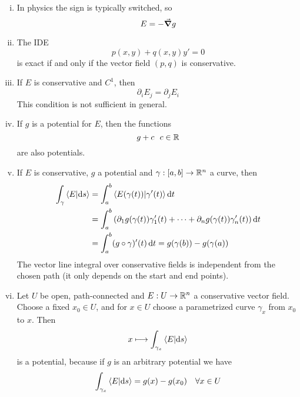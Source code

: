 \documentclass[../../script.tex]{subfiles}
\begin{document}
\begin{rem}
    \begin{enumerate}[(i)]
        \item In physics the sign is typically switched, so 
        \[
            E = -\grad{g}
        \]

        \item The IDE 
        \[
            p(x, y) + q(x, y)y' = 0
        \]
        is exact if and only if the vector field $(p, q)$ is conservative.

        \item If $E$ is conservative and $C^1$, then 
        \[
            \partial_i E_j = \partial_j E_i
        \]
        This condition is not sufficient in general.

        \item If $g$ is a potential for $E$, then the functions
        \[
            g + c ~~c \in \mathbb{R}
        \]
        are also potentials.

        \item If $E$ is conservative, $g$ a potential and $\gamma: [a, b] \rightarrow \mathbb{R}^n$ a curve, then
        \begin{align*}
            \int_{\gamma} \innerproduct{E}{\dd{s}} &= \int_a^b \innerproduct{E(\gamma(t))}{\gamma'(t)} \dd{t} \\
            &= \int_a^b \left(\partial_1 g(\gamma(t)) \gamma_1'(t) + \cdots + \partial_n g(\gamma(t))\gamma_n'(t)\right) \dd{t} \\
            &= \int_a^b (g \circ \gamma)'(t) \dd{t} = g(\gamma(b)) - g(\gamma(a))
        \end{align*}
        The vector line integral over conservative fields is independent from the chosen path (it only depends on the start and end points).

        \item Let $U$ be open, path-connected and $E: U \rightarrow \mathbb{R}^n$ a conservative vector field. 
        Choose a fixed $x_0 \in U$, and for $x \in U$ choose a parametrized curve $\gamma_x$ from $x_0$ to $x$.
        Then 
        \[
            x \longmapsto \int_{\gamma_x} \innerproduct{E}{\dd{s}}
        \]
        is a potential, because if $g$ is an arbitrary potential we have 
        \[
            \int_{\gamma_x} \innerproduct{E}{\dd{s}} = g(x) - g(x_0) \quad \forall x \in U
        \]
    \end{enumerate}
\end{rem}
\end{document}
